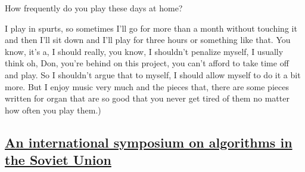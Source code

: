 \documentclass[]{article}
\begin{document}
How frequently do you play these days at home?

I play in spurts, so sometimes I'll go for more than a month without
touching it and then I'll sit down and I'll play for three hours or
something like that. You know, it's a, I should really, you know, I
shouldn't penalize myself, I usually think oh, Don, you're behind on
this project, you can't afford to take time off and play. So I shouldn't
argue that to myself, I should allow myself to do it a bit more. But I
enjoy music very much and the pieces that, there are some pieces written
for organ that are so good that you never get tired of them no matter
how often you play them.)

\subsection{\texorpdfstring{\href{http://webofstories.com/play/17150}{An
international symposium on algorithms in the Soviet
Union}}{An international symposium on algorithms in the Soviet Union}}\label{an-international-symposium-on-algorithms-in-the-soviet-union}
\end{document}
